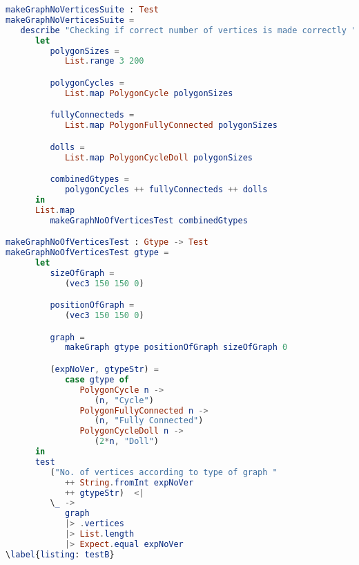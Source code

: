 \begin{lstlisting}[language=elm
                  , caption={
                  Property Based Testing of construction 
                  graphs based on their type. For example,
                  the graph with a given number of vertices
                  should have the number of edges dependent on
                  the number of vertices.
                  }
                  ]
makeGraphNoVerticesSuite : Test
makeGraphNoVerticesSuite =
   describe "Checking if correct number of vertices is made correctly " <|
      let
         polygonSizes =
            List.range 3 200

         polygonCycles =
            List.map PolygonCycle polygonSizes

         fullyConnecteds =
            List.map PolygonFullyConnected polygonSizes

         dolls =
            List.map PolygonCycleDoll polygonSizes

         combinedGtypes =
            polygonCycles ++ fullyConnecteds ++ dolls
      in
      List.map
         makeGraphNoOfVerticesTest combinedGtypes

makeGraphNoOfVerticesTest : Gtype -> Test
makeGraphNoOfVerticesTest gtype =
      let
         sizeOfGraph =
            (vec3 150 150 0)

         positionOfGraph =
            (vec3 150 150 0)

         graph =
            makeGraph gtype positionOfGraph sizeOfGraph 0

         (expNoVer, gtypeStr) =
            case gtype of
               PolygonCycle n ->
                  (n, "Cycle")
               PolygonFullyConnected n ->
                  (n, "Fully Connected")
               PolygonCycleDoll n ->
                  (2*n, "Doll")
      in
      test 
         ("No. of vertices according to type of graph " 
            ++ String.fromInt expNoVer
            ++ gtypeStr)  <|
         \_ ->
            graph
            |> .vertices
            |> List.length
            |> Expect.equal expNoVer
\label{listing: testB}
\end{lstlisting}
